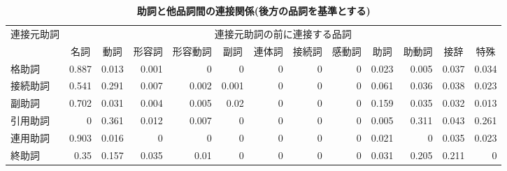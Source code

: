 \begin{table}
\begin{center}
\caption{\bf 助詞と他品詞間の連接関係(後方の品詞を基準とする)}
 \label{tab:particle_connect_matrix}
 \tiny
\def\arraystretch{}
 \begin{tabular}{l|r|r|r|r|r|r|r|r|r|r|r|r} \hline \hline
 {連接元助詞} & \multicolumn{12}{c}{連接元助詞の前に連接する品詞}                                                              \\ \cline{2-13}
             & \multicolumn{1}{c|}{名詞}
             & \multicolumn{1}{c|}{動詞}
             & \multicolumn{1}{c|}{形容詞}
             & \multicolumn{1}{c|}{形容動詞}
             & \multicolumn{1}{c|}{副詞}
             & \multicolumn{1}{c|}{連体詞}
             & \multicolumn{1}{c|}{接続詞}
             & \multicolumn{1}{c|}{感動詞}
             & \multicolumn{1}{c|}{助詞}
             & \multicolumn{1}{c|}{助動詞}
             & \multicolumn{1}{c|}{接辞}
             & \multicolumn{1}{c}{特殊} \\ \hline
   格助詞    & 0.887 &  0.013 &  0.001 &      0 &      0 
             &      0 &     0  &      0 &  0.023    
             &  0.005 &  0.037 &  0.034  \\
   \hline
   接続助詞  & 0.541 & 0.291 &  0.007 &  0.002 &  0.001 
             &      0 &      0 &      0 &  0.061   
             &  0.036 &  0.038 &  0.023  \\
   \hline
   副助詞    & 0.702 &  0.031 &  0.004 &  0.005 &  0.02 
             &      0 &      0 &      0 & 0.159
             &  0.035 &  0.032 &  0.013  \\
   \hline
   引用助詞  &    0   & 0.361 &  0.012 &  0.007 &      0 
             &    0   &     0  &     0  &  0.005     
             & 0.311 &  0.043 & 0.261  \\
   \hline
   連用助詞  & 0.903 &  0.016 &    0   &      0 &     0  
             &     0  &     0  &    0   &  0.021
             &     0  &  0.035 &  0.023  \\
   \hline
   終助詞    & 0.35 & 0.157 &  0.035 &  0.01 &     0  
             &     0  &     0  &     0  &  0.031
             & 0.205 & 0.211 &  0   \\
   \hline
\end{tabular}
\end{center}
\end{table}

